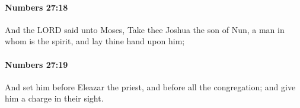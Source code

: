 		\paragraph{Numbers 27:18} %
			\label{NUMBERS-27-18}

			And the LORD said unto Moses, Take thee Joshua the son of Nun, a man in whom is the spirit, and lay thine hand upon him;


		\paragraph{Numbers 27:19} %
			\label{NUMBERS-27-19}

			And set him before Eleazar the priest, and before all the congregation; and give him a charge in their sight.


